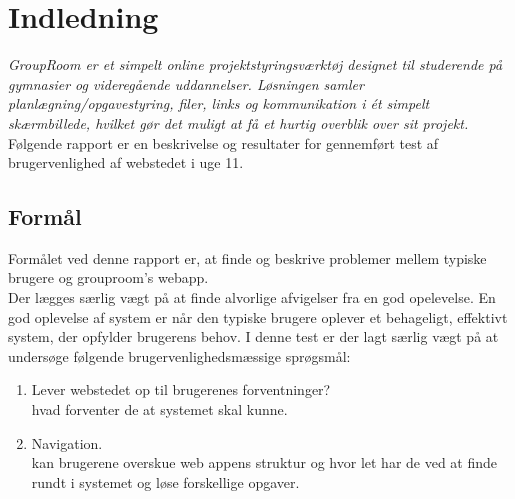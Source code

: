 \documentclass[12pt]{article}
\begin{document}
\section{Indledning}
\textit{
GroupRoom er et simpelt online projektstyringsværktøj designet til studerende på gymnasier og
videregående uddannelser. Løsningen samler planlægning/opgavestyring, filer, links og kommunikation i ét simpelt skærmbillede, hvilket gør det muligt at få et hurtig overblik over sit projekt.}\\
Følgende rapport er en beskrivelse og resultater for gennemført test af brugervenlighed af webstedet i uge 11.
\subsection{Formål}
Formålet ved denne rapport er, at finde og beskrive problemer mellem typiske brugere og grouproom's webapp. \\
Der lægges særlig vægt på at finde alvorlige afvigelser fra en god opelevelse. En god oplevelse af system er når den typiske brugere oplever et behageligt, effektivt system, der opfylder brugerens behov. I denne test er der lagt særlig vægt på at undersøge følgende brugervenlighedsmæssige sprøgsmål:
\begin{enumerate}
  \item Lever webstedet op til brugerenes forventninger? \\
        hvad forventer de at systemet skal kunne.
  \item Navigation. \\
        kan brugerene overskue web appens struktur og hvor let har de ved at finde rundt i systemet og løse forskellige opgaver.
\end{enumerate}
\end{document}
